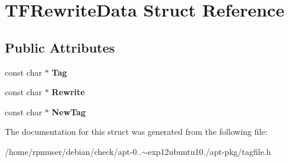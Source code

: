 \section{\-T\-F\-Rewrite\-Data \-Struct \-Reference}
\label{structTFRewriteData}
\subsection*{\-Public \-Attributes}
\begin{DoxyCompactItemize}
\item 
const char $\ast$ {\bfseries \-Tag}\label{structTFRewriteData_a7e60713be34e97c29537fa19e023fdd8}

\item 
const char $\ast$ {\bfseries \-Rewrite}\label{structTFRewriteData_ae040c4b6148e065246afadf07e10162b}

\item 
const char $\ast$ {\bfseries \-New\-Tag}\label{structTFRewriteData_aca62e38c39240203b8f45732e77d3f93}

\end{DoxyCompactItemize}


\-The documentation for this struct was generated from the following file\-:\begin{DoxyCompactItemize}
\item 
/home/rpmuser/debian/check/apt-\/0..$\sim$exp12ubuntu10./apt-\/pkg/tagfile.\-h\end{DoxyCompactItemize}
